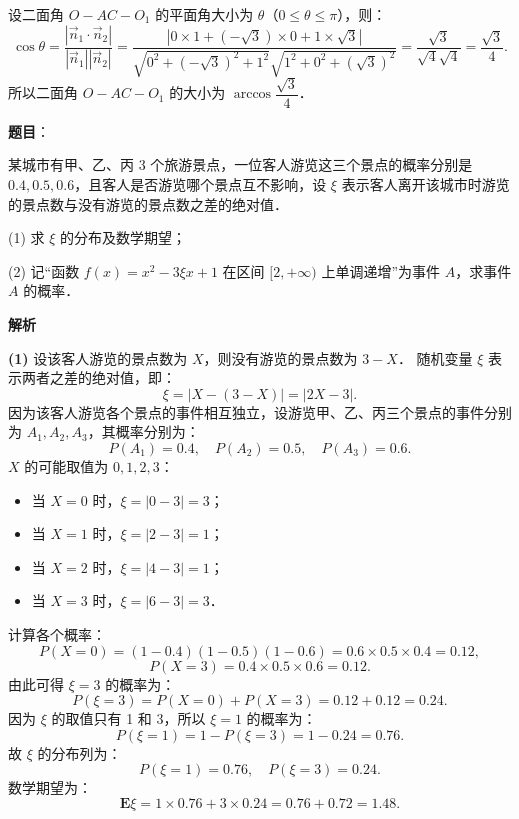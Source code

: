 \begin{answer}
设二面角 $O - AC - O_1$ 的平面角大小为 $\theta$（$0 \leqslant \theta \leqslant \pi$），则：
\nopagebreak[4]
\[
\cos\theta = \frac{|\vec{n}_1 \cdot \vec{n}_2|}{|\vec{n}_1| |\vec{n}_2|} = \frac{|0 \times 1 + (-\sqrt{3}) \times 0 + 1 \times \sqrt{3}|}{\sqrt{0^2 + (-\sqrt{3})^2 + 1^2} \sqrt{1^2 + 0^2 + (\sqrt{3})^2}} = \frac{\sqrt{3}}{\sqrt{4}\sqrt{4}} = \frac{\sqrt{3}}{4}.
\]
所以二面角 $O - AC - O_1$ 的大小为 $\arccos \dfrac{\sqrt{3}}{4}$．



\end{answer}
\begin{answer}

\textbf{题目}：

某城市有甲、乙、丙 3 个旅游景点，一位客人游览这三个景点的概率分别是 $0.4, 0.5, 0.6$，且客人是否游览哪个景点互不影响，设 $\xi$ 表示客人离开该城市时游览的景点数与没有游览的景点数之差的绝对值．

(1) 求 $\xi$ 的分布及数学期望；

(2) 记“函数 $f(x) = x^2 - 3\xi x + 1$ 在区间 $[2, +\infty)$ 上单调递增”为事件 $A$，求事件 $A$ 的概率．

\textbf{解析}

\textbf{(1)}
设该客人游览的景点数为 $X$，则没有游览的景点数为 $3 - X$．
随机变量 $\xi$ 表示两者之差的绝对值，即：
\nopagebreak[4]
\[
\xi = |X - (3 - X)| = |2X - 3|.
\]
因为该客人游览各个景点的事件相互独立，设游览甲、乙、丙三个景点的事件分别为 $A_1, A_2, A_3$，其概率分别为：
\nopagebreak[4]
\[
P(A_1) = 0.4, \quad P(A_2) = 0.5, \quad P(A_3) = 0.6.
\]
$X$ 的可能取值为 $0, 1, 2, 3$：
\begin{itemize}
\item 当 $X = 0$ 时，$\xi = |0 - 3| = 3$；
\item 当 $X = 1$ 时，$\xi = |2 - 3| = 1$；
\item 当 $X = 2$ 时，$\xi = |4 - 3| = 1$；
\item 当 $X = 3$ 时，$\xi = |6 - 3| = 3$．
\end{itemize}

计算各个概率：
\nopagebreak[4]
\[
P(X = 0) = (1 - 0.4)(1 - 0.5)(1 - 0.6) = 0.6 \times 0.5 \times 0.4 = 0.12,
\]
\nopagebreak[4]
\[
P(X = 3) = 0.4 \times 0.5 \times 0.6 = 0.12.
\]
由此可得 $\xi = 3$ 的概率为：
\nopagebreak[4]
\[
P(\xi = 3) = P(X = 0) + P(X = 3) = 0.12 + 0.12 = 0.24.
\]
因为 $\xi$ 的取值只有 1 和 3，所以 $\xi = 1$ 的概率为：
\nopagebreak[4]
\[
P(\xi = 1) = 1 - P(\xi = 3) = 1 - 0.24 = 0.76.
\]
故 $\xi$ 的分布列为：
\nopagebreak[4]
\[
P(\xi = 1) = 0.76, \quad P(\xi = 3) = 0.24.
\]
数学期望为：
\nopagebreak[4]
\[
\mathbf{E}\xi = 1 \times 0.76 + 3 \times 0.24 = 0.76 + 0.72 = 1.48.
\]


\end{answer}
